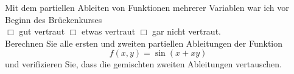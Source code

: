 \documentclass[12pt]{exam}
\begin{document}
\begin{questions}
\begin{parts}
\part \[\begin{array}{ll}
 f(t)  &={\rm e}^{t^2-tx+x}\\ ~~\\
 f'(t) &= \\ ~~\\
 f''(t)&= \\ ~~\\
\end{array}~~~~~~~~~~~~~~~~~~~~~~~~~~~~~~~~~~~~~~~~~~~~~~~~~~~~~~~~~~~~~~~~~~~~\]


\part \[\begin{array}{ll}
 f(x)  &=a\cos(\omega x+\varphi)-b x\\ ~~\\
 f'(x) &= \\ ~~\\
 f''(x)&= \\ ~~\\
\end{array}~~~~~~~~~~~~~~~~~~~~~~~~~~~~~~~~~~~~~~~~~~~~~~~~~~~~~\]


\part \[\begin{array}{ll}
 g(\lambda)  &=\sqrt{\lambda^3+a^2}\\ ~~\\
 g'(\lambda) &= \\ ~~\\
 g''(\lambda)&= \\ ~~\\
\end{array}~~~~~~~~~~~~~~~~~~~~~~~~~~~~~~~~~~~~~~~~~~~~~~~~~~~~~~~~~~~~~~~~~~~~\]

\end{parts}

\pagebreak
{}

Mit dem partiellen Ableiten von Funktionen mehrerer Variablen war ich vor Beginn des Brückenkurses\\ $\Box$ gut vertraut \hfill $\Box$ etwas vertraut \hfill $\Box$ gar nicht vertraut. \\[2ex]
Berechnen Sie alle ersten und zweiten partiellen Ableitungen der Funktion
\[
f(x,y)=\sin(x+xy)
\]
und verifizieren Sie, dass die gemischten zweiten Ableitungen vertauschen.


\end{questions}
\end{document}
